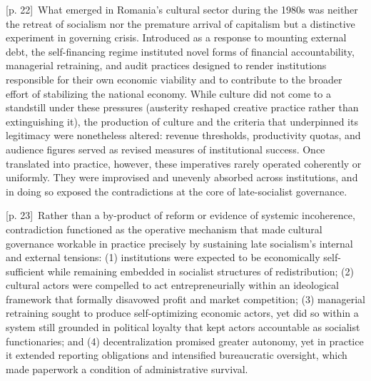 \documentclass[10pt,a4paper]{article}
\begin{document}
{\scriptsize\color{gray} [p. 22]}\ What emerged in Romania’s cultural sector during the 1980s was neither the retreat of socialism nor the premature arrival of capitalism but a distinctive experiment in governing crisis. Introduced as a response to mounting external debt, the self-financing regime instituted novel forms of financial accountability, managerial retraining, and audit practices designed to render institutions responsible for their own economic viability and to contribute to the broader effort of stabilizing the national economy. While culture did not come to a standstill under these pressures (austerity reshaped creative practice rather than extinguishing it), the production of culture and the criteria that underpinned its legitimacy were nonetheless altered: revenue thresholds, productivity quotas, and audience figures served as revised measures of institutional success. Once translated into practice, however, these imperatives rarely operated coherently or uniformly. They were improvised and unevenly absorbed across institutions, and in doing so exposed the contradictions at the core of late-socialist governance.\par
{\scriptsize\color{gray} [p. 23]}\ Rather than a by-product of reform or evidence of systemic incoherence, contradiction functioned as the operative mechanism that made cultural governance workable in practice precisely by sustaining late socialism’s internal and external tensions: (1) institutions were expected to be economically self-sufficient while remaining embedded in socialist structures of redistribution; (2) cultural actors were compelled to act entrepreneurially within an ideological framework that formally disavowed profit and market competition; (3) managerial retraining sought to produce self-optimizing economic actors, yet did so within a system still grounded in political loyalty that kept actors accountable as socialist functionaries; and (4) decentralization promised greater autonomy, yet in practice it extended reporting obligations and intensified bureaucratic oversight, which made paperwork a condition of administrative survival.\par
\end{document}
